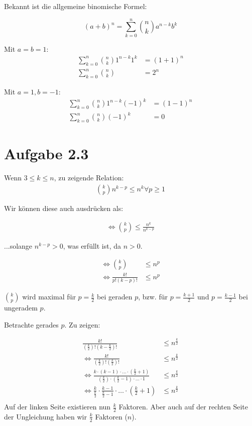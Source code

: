 \documentclass[a4paper,german,12pt,smallheadings]{scrartcl}
\begin{document}
Bekannt ist die allgemeine binomische Formel:

\begin{equation*}
  (a+b)^n = \sum_{k=0}^n {n \choose k} a^{n-k} b^k
\end{equation*}

Mit $a=b=1$:
\begin{align*}
 \sum_{k=0}^n {n \choose k} 1^{n-k} 1^k &= (1+1)^n \\
  \sum_{k=0}^n {n \choose k} &= 2^n
\end{align*}

Mit $a=1, b=-1$:
\begin{align*}
  \sum_{k=0}^n {n \choose k} 1^{n-k} (-1)^k &= (1-1)^n \\
  \sum_{k=0}^n {n \choose k} (-1)^k &= 0
\end{align*}


\section*{Aufgabe 2.3}
Wenn $3 \le k \le n$, zu zeigende Relation:
\begin{align*}
  {k \choose p} n^{k-p} \le n^k \forall p \ge 1
\end{align*}

Wir können diese auch ausdrücken als:

\begin{align*}
  \Leftrightarrow {k \choose p} \le \frac{n^k}{n^{k-p}}
\end{align*}

...solange $n^{k-p} > 0$, was erfüllt ist, da $n > 0$.

\begin{align*}
  \Leftrightarrow {k \choose p} &\le n^p \\
  \Leftrightarrow \frac{k!}{p!(k-p)!} &\le n^p
\end{align*}

$k \choose p$ wird maximal für $p=\frac{k}{2}$ bei geraden $p$, bzw. für $p=\frac{k+1}{2}$ und $p=\frac{k-1}{2}$ bei ungeradem $p$.

Betrachte gerades $p$. Zu zeigen:

\begin{align*}
  \frac{k!}{\left(\frac{k}{2}\right)! \left(k-\frac{k}{2}\right)!} &\le n^\frac{k}{2} \\
  \Leftrightarrow \frac{k!}{\left(\frac{k}{2}\right)! \left(\frac{k}{2}\right)!} &\le n^\frac{k}{2} \\
  \Leftrightarrow \frac{k \cdot (k-1) \cdot \dots \cdot \left(\frac{k}{2}+1\right)}{ \left(\frac{k}{2}\right) \cdot \left(\frac{k}{2}-1\right) \cdot \dots \cdot 1} &\le n^\frac{k}{2} \\
  \Leftrightarrow \frac{k}{\frac{k}{2}} \cdot \frac{k-1}{\frac{k}{2} - 1} \cdot \dots \cdot \left(\frac{k}{2} + 1\right) &\le n^\frac{k}{2} \\
\end{align*}
Auf der linken Seite existieren nun $\frac{k}{2}$ Faktoren. Aber auch auf der rechten Seite der Ungleichung haben wir $\frac{k}{2}$ Faktoren ($n$).
\end{document}
